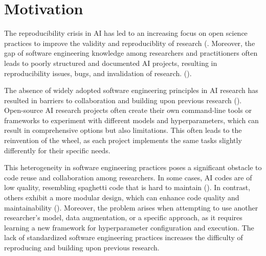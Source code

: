 
\section{Motivation}


The reproducibility crisis in AI has led to an increasing focus on open science practices to improve the validity and reproduciblity of research (\cite{coro2020open,braun2018open,hicks2021open,paton2019open,kocak2022transparency,stodden-towardreprodicibleresearch}. Moreover, the gap of software engineering knowledge among researchers and practitioners often leads to poorly structured and documented AI projects, resulting in reproducibility issues, bugs, and invalidation of research. (\cite{leakage-recrisis,epskamp2019reproducibilitybug, seAIsurvey, martinez2022softwareAI,mainatiblity}).
 


The absence of widely adopted software engineering principles in AI research has resulted in barriers to collaboration and building upon previous research (\cite{accountabilityInAi}). Open-source AI research projects often create their own command-line tools or frameworks to experiment with different models and hyperparameters, which can result in comprehensive options but also limitations. This often leads to the reinvention of the wheel, as each project implements the same tasks slightly differently for their specific needs.


This heterogeneity in software engineering practices poses a significant obstacle to code reuse and collaboration among researchers. In some cases, AI codes are of low quality, resembling spaghetti code that is hard to maintain (\cite{seAIsurvey,martinez2022softwareAI,amershi2019software,mainatiblity,leakage-recrisis,gezici2022systematicsoftware}). In contrast, others exhibit a more modular design, which can enhance code quality and maintainability (\cite{seAIsurvey,martinez2022softwareAI,wan2019does}). Moreover, the problem arises when attempting to use another researcher's model, data augmentation, or a specific approach, as it requires learning a new framework for hyperparameter configuration and execution. The lack of standardized software engineering practices increases the difficulty of reproducing and building upon previous research.
